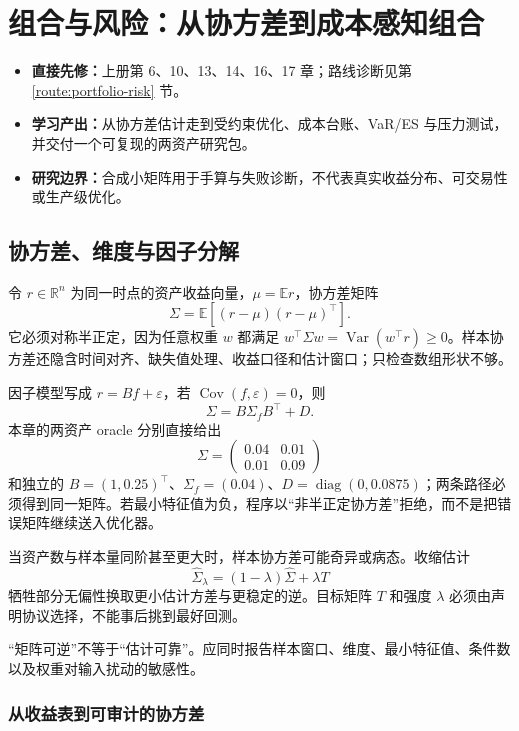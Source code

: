 \chapter{组合与风险：从协方差到成本感知组合}

\begin{itemize}
  \item \textbf{直接先修：}上册第 6、10、13、14、16、17 章；路线诊断见第 \ref{route:portfolio-risk} 节。
  \item \textbf{学习产出：}从协方差估计走到受约束优化、成本台账、VaR/ES 与压力测试，并交付一个可复现的两资产研究包。
  \item \textbf{研究边界：}合成小矩阵用于手算与失败诊断，不代表真实收益分布、可交易性或生产级优化。
\end{itemize}

\section{协方差、维度与因子分解}

令 $r\in\mathbb R^n$ 为同一时点的资产收益向量，$\mu=\mathbb E r$，协方差矩阵
\[
 \Sigma=\mathbb E[(r-\mu)(r-\mu)^\top].
\]
它必须对称半正定，因为任意权重 $w$ 都满足 $w^\top\Sigma w=\operatorname{Var}(w^\top r)\ge0$。样本协方差还隐含时间对齐、缺失值处理、收益口径和估计窗口；只检查数组形状不够。

因子模型写成 $r=Bf+\varepsilon$，若 $\operatorname{Cov}(f,\varepsilon)=0$，则
\[
 \Sigma=B\Sigma_f B^\top+D.
\]
本章的两资产 oracle 分别直接给出
\[
 \Sigma=\begin{pmatrix}0.04&0.01\\0.01&0.09\end{pmatrix}
\]
和独立的 $B=(1,0.25)^\top$、$\Sigma_f=(0.04)$、$D=\operatorname{diag}(0,0.0875)$；两条路径必须得到同一矩阵。若最小特征值为负，程序以“非半正定协方差”拒绝，而不是把错误矩阵继续送入优化器。

当资产数与样本量同阶甚至更大时，样本协方差可能奇异或病态。收缩估计
\[
 \widehat\Sigma_\lambda=(1-\lambda)\widehat\Sigma+\lambda T
\]
牺牲部分无偏性换取更小估计方差与更稳定的逆。目标矩阵 $T$ 和强度 $\lambda$ 必须由声明协议选择，不能事后挑到最好回测。

\begin{diagnostic}
“矩阵可逆”不等于“估计可靠”。应同时报告样本窗口、维度、最小特征值、条件数以及权重对输入扰动的敏感性。
\end{diagnostic}

\subsection{从收益表到可审计的协方差}

